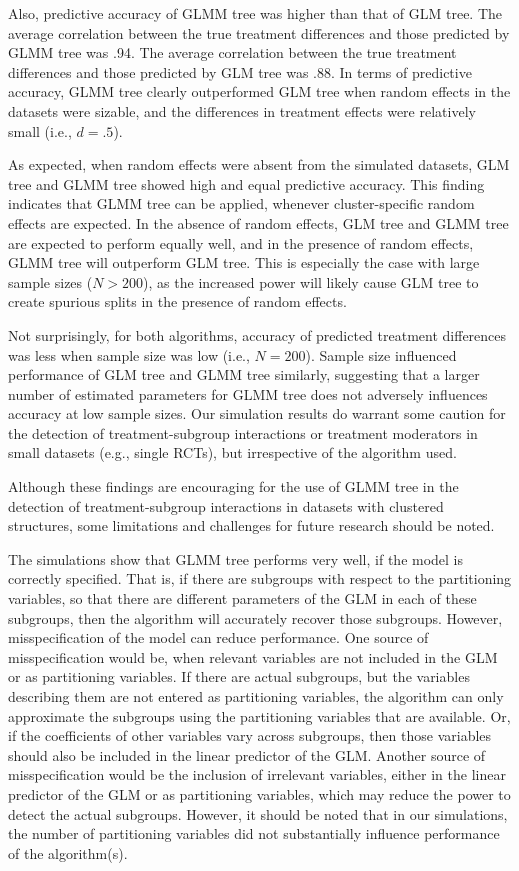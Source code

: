 \documentclass[nobf,doc]{apa}
\begin{document}
Also, predictive accuracy of GLMM tree was higher than that of GLM tree. The average correlation between the true treatment differences and those predicted by GLMM tree was .94.  The average correlation between the true treatment differences and those predicted by GLM tree was .88. In terms of predictive accuracy, GLMM tree clearly outperformed GLM tree when random effects in the datasets were sizable, and the differences in treatment effects were relatively small (i.e., $d=.5$).

As expected, when random effects were absent from the simulated datasets, GLM tree and GLMM tree showed high and equal predictive accuracy. This finding indicates that GLMM tree can be applied, whenever cluster-specific random effects are expected. In the absence of random effects, GLM tree and GLMM tree are expected to perform equally well, and in the presence of random effects, GLMM tree will outperform GLM tree. This is especially the case with large sample sizes ($N > 200$), as the increased power will likely cause GLM tree to create spurious splits in the presence of random effects. 

Not surprisingly, for both algorithms, accuracy of predicted treatment differences was less when sample size was low (i.e., $N=200$). Sample size influenced performance of GLM tree and GLMM tree similarly, suggesting that a larger number of estimated parameters for GLMM tree does not adversely influences accuracy at low sample sizes. Our simulation results do warrant some caution for the detection of treatment-subgroup interactions or treatment moderators in small datasets (e.g., single RCTs), but irrespective of the algorithm used. 

Although these findings are encouraging for the use of GLMM tree in the detection of treatment-subgroup interactions in datasets with clustered structures, some limitations and challenges for future research should be noted.

The simulations show that GLMM tree performs very well, if the model is correctly specified. That is, if there are subgroups with respect to the partitioning variables, so that there are different parameters of the GLM in each of these subgroups, then the algorithm will accurately recover those subgroups. However, misspecification of the model can reduce performance. One source of misspecification would be, when relevant variables are not included in the GLM or as partitioning variables. If there are actual subgroups, but the variables describing them are not entered as partitioning variables, the algorithm can only approximate the subgroups using the partitioning variables that are available. Or, if the coefficients of other variables vary across subgroups, then those variables should also be included in the linear predictor of the GLM. Another source of misspecification would be the inclusion of irrelevant variables, either in the linear predictor of the GLM or as partitioning variables, which may reduce the power to detect the actual subgroups. However, it should be noted that in our simulations, the number of partitioning variables did not substantially influence performance of the algorithm(s). 
  
\end{document}
